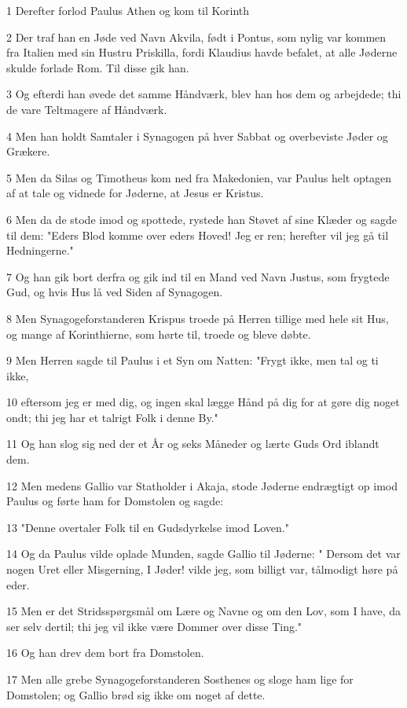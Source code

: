 \par 1 Derefter forlod Paulus Athen og kom til Korinth
\par 2 Der traf han en Jøde ved Navn Akvila, født i Pontus, som nylig var kommen fra Italien med sin Hustru Priskilla, fordi Klaudius havde befalet, at alle Jøderne skulde forlade Rom. Til disse gik han.
\par 3 Og efterdi han øvede det samme Håndværk, blev han hos dem og arbejdede; thi de vare Teltmagere af Håndværk.
\par 4 Men han holdt Samtaler i Synagogen på hver Sabbat og overbeviste Jøder og Grækere.
\par 5 Men da Silas og Timotheus kom ned fra Makedonien, var Paulus helt optagen af at tale og vidnede for Jøderne, at Jesus er Kristus.
\par 6 Men da de stode imod og spottede, rystede han Støvet af sine Klæder og sagde til dem: "Eders Blod komme over eders Hoved! Jeg er ren; herefter vil jeg gå til Hedningerne."
\par 7 Og han gik bort derfra og gik ind til en Mand ved Navn Justus, som frygtede Gud, og hvis Hus lå ved Siden af Synagogen.
\par 8 Men Synagogeforstanderen Krispus troede på Herren tillige med hele sit Hus, og mange af Korinthierne, som hørte til, troede og bleve døbte.
\par 9 Men Herren sagde til Paulus i et Syn om Natten: "Frygt ikke, men tal og ti ikke,
\par 10 eftersom jeg er med dig, og ingen skal lægge Hånd på dig for at gøre dig noget ondt; thi jeg har et talrigt Folk i denne By."
\par 11 Og han slog sig ned der et År og seks Måneder og lærte Guds Ord iblandt dem.
\par 12 Men medens Gallio var Statholder i Akaja, stode Jøderne endrægtigt op imod Paulus og førte ham for Domstolen og sagde:
\par 13 "Denne overtaler Folk til en Gudsdyrkelse imod Loven."
\par 14 Og da Paulus vilde oplade Munden, sagde Gallio til Jøderne: " Dersom det var nogen Uret eller Misgerning, I Jøder! vilde jeg, som billigt var, tålmodigt høre på eder.
\par 15 Men er det Stridsspørgsmål om Lære og Navne og om den Lov, som I have, da ser selv dertil; thi jeg vil ikke være Dommer over disse Ting."
\par 16 Og han drev dem bort fra Domstolen.
\par 17 Men alle grebe Synagogeforstanderen Sosthenes og sloge ham lige for Domstolen; og Gallio brød sig ikke om noget af dette.
